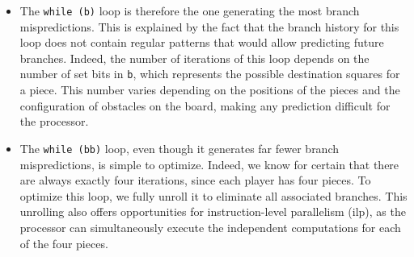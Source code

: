 \documentclass[12pt,a4paper,twoside,openright]{book}
\begin{document}
\begin{itemize}
\item The \texttt{while (b)} loop is therefore the one generating the most branch mispredictions. This is explained by the fact that the branch history for this loop does not contain regular patterns that would allow predicting future branches. Indeed, the number of iterations of this loop depends on the number of set bits in \texttt{b}, which represents the possible destination squares for a piece. This number varies depending on the positions of the pieces and the configuration of obstacles on the board, making any prediction difficult for the processor.
\item The \texttt{while (bb)} loop, even though it generates far fewer branch mispredictions, is simple to optimize. Indeed, we know for certain that there are always exactly four iterations, since each player has four pieces. To optimize this loop, we fully unroll it to eliminate all associated branches. This unrolling also offers opportunities for instruction-level parallelism (\gls{ilp}), as the processor can simultaneously execute the independent computations for each of the four pieces.
\end{itemize}
\end{document}
